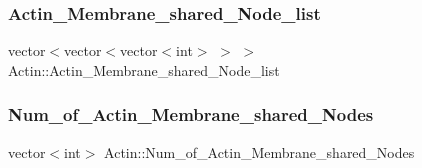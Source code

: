\subsubsection{\texorpdfstring{Actin\_Membrane\_shared\_Node\_list}{Actin\_Membrane\_shared\_Node\_list}}
{\footnotesize\ttfamily vector$<$vector$<$vector$<$int$>$ $>$ $>$ Actin\+::\+Actin\+\_\+\+Membrane\+\_\+shared\+\_\+\+Node\+\_\+list}

\mbox{\label{classActin_aad926245a82c384b8e81dc55afec2f34}} 
\subsubsection{\texorpdfstring{Num\_of\_Actin\_Membrane\_shared\_Nodes}{Num\_of\_Actin\_Membrane\_shared\_Nodes}}
{\footnotesize\ttfamily vector$<$int$>$ Actin\+::\+Num\+\_\+of\+\_\+\+Actin\+\_\+\+Membrane\+\_\+shared\+\_\+\+Nodes}



